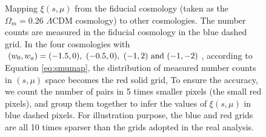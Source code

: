 \documentclass[iop]{emulateapj}
\begin{document}
\begin{figure}
   \caption{\label{fig_method}
   Mapping $\xi(s,\mu)$ from the fiducial cosmology (taken as the $\Omega_m=0.26$ $\Lambda$CDM cosmology) to other cosmologies. 
 The number counts are measured in the fiducial cosmology in the blue dashed grid.
 In the four cosmologies with $(w_0,w_a) = (-1.5,0),\ (-0.5,0),\ (-1,2)\ \rm and\ (-1,-2)$,
 according to Equation \ref{eq:smumap},
 the distribution of measured number counts in $(s, \mu)$ space becomes the red solid grid,
 To ensure the accuracy, we count the number of pairs in 5 times smaller pixels (the small red pixels), 
 and group them together to infer the values of $\xi(s, \mu)$ in blue dashed pixels.
 For illustration purpose, 
  the blue and red grids are all 10 times sparser than the grids adopted in the real analysis.
}
\end{figure}
\end{document}
